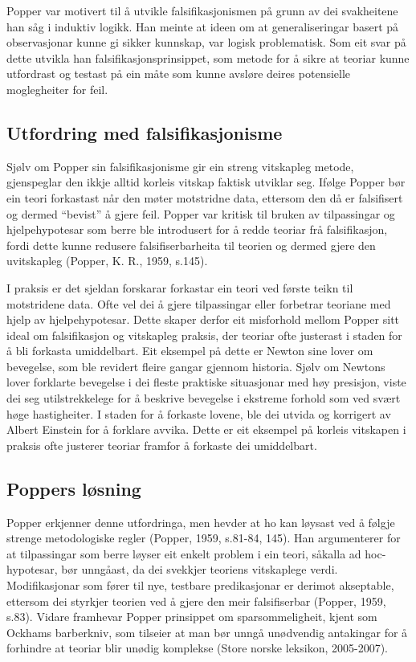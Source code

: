 \documentclass[
  letterpaper,
  DIV=11,
  numbers=noendperiod]{scrreprt}
\begin{document}
Popper var motivert til å utvikle falsifikasjonismen på grunn av dei
svakheitene han såg i induktiv logikk. Han meinte at ideen om at
generaliseringar basert på observasjonar kunne gi sikker kunnskap, var
logisk problematisk. Som eit svar på dette utvikla han
falsifikasjonsprinsippet, som metode for å sikre at teoriar kunne
utfordrast og testast på ein måte som kunne avsløre deires potensielle
moglegheiter for feil.

\subsection{Utfordring med
falsifikasjonisme}\label{utfordring-med-falsifikasjonisme}

Sjølv om Popper sin falsifikasjonisme gir ein streng vitskapleg metode,
gjenspeglar den ikkje alltid korleis vitskap faktisk utviklar seg.
Ifølge Popper bør ein teori forkastast når den møter motstridne data,
ettersom den då er falsifisert og dermed ``bevist'' å gjere feil. Popper
var kritisk til bruken av tilpassingar og hjelpehypotesar som berre ble
introdusert for å redde teoriar frå falsifikasjon, fordi dette kunne
redusere falsifiserbarheita til teorien og dermed gjere den uvitskapleg
(Popper, K. R., 1959, s.145).

I praksis er det sjeldan forskarar forkastar ein teori ved første teikn
til motstridene data. Ofte vel dei å gjere tilpassingar eller forbetrar
teoriane med hjelp av hjelpehypotesar. Dette skaper derfor eit
misforhold mellom Popper sitt ideal om falsifikasjon og vitskapleg
praksis, der teoriar ofte justerast i staden for å bli forkasta
umiddelbart. Eit eksempel på dette er Newton sine lover om bevegelse,
som ble revidert fleire gangar gjennom historia. Sjølv om Newtons lover
forklarte bevegelse i dei fleste praktiske situasjonar med høy
presisjon, viste dei seg utilstrekkelege for å beskrive bevegelse i
ekstreme forhold som ved svært høge hastigheiter. I staden for å
forkaste lovene, ble dei utvida og korrigert av Albert Einstein for å
forklare avvika. Dette er eit eksempel på korleis vitskapen i praksis
ofte justerer teoriar framfor å forkaste dei umiddelbart.

\subsection{Poppers løsning}\label{poppers-luxf8sning}

Popper erkjenner denne utfordringa, men hevder at ho kan løysast ved å
følgje strenge metodologiske regler (Popper, 1959, s.81-84, 145). Han
argumenterer for at tilpassingar som berre løyser eit enkelt problem i
ein teori, såkalla ad hoc-hypotesar, bør unngåast, da dei svekkjer
teoriens vitskaplege verdi. Modifikasjonar som fører til nye, testbare
predikasjonar er derimot akseptable, ettersom dei styrkjer teorien ved å
gjere den meir falsifiserbar (Popper, 1959, s.83). Vidare framhevar
Popper prinsippet om sparsommeligheit, kjent som Ockhams barberkniv, som
tilseier at man bør unngå unødvendig antakingar for å forhindre at
teoriar blir unødig komplekse (Store norske leksikon, 2005-2007).
\end{document}
